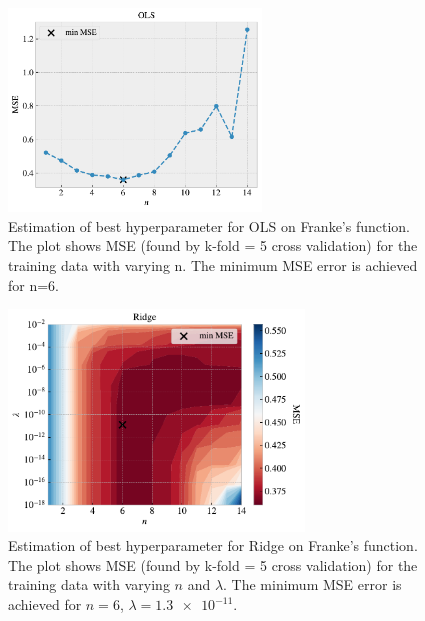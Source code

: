 \documentclass[norsk,a4paper,12pt]{scrartcl}
\begin{document}
\begin{figure}[H]
    \centering
    \includegraphics[width=0.60\textwidth]{figures/Franke_best_OLS_map_B.pdf}
    \caption{ Estimation of best hyperparameter for OLS on Franke's function. The plot shows MSE  (found  by  k-fold  =  5  cross  validation)  for  the  training  data  with varying n. The minimum MSE error is achieved for n=6.}
    \label{fig:OLS_franke_hyper}
\end{figure}

\begin{figure}[H]
    \centering
    \includegraphics[width=0.7\textwidth]{figures/Franke_best_Ridge_map_B.pdf}
    \caption{Estimation of best hyperparameter for Ridge on Franke's function. The plot shows MSE (found by k-fold = 5 cross validation) for the training data with varying $n$ and $\lambda$. The minimum MSE error is achieved for $n = 6$, $\lambda = \num{1.3e-11}$.}
    \label{fig:Ridge_franke_hyper}
\end{figure}
\end{document}
